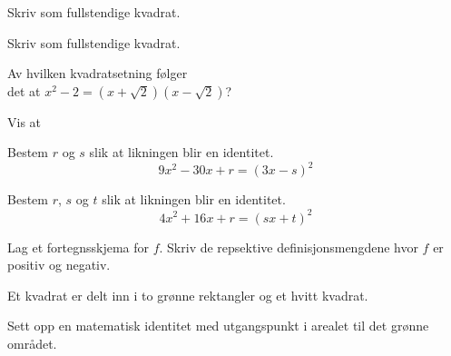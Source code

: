 





\opgt	

Skriv som fullstendige kvadrat.\os
{} \os
{}

Skriv som fullstendige kvadrat.\os
{} \os
{}

Av hvilken kvadratsetning følger\\ det at $x^2-2 = \left(x+\sqrt{2}\right)\left(x-\sqrt{2}\right)$?

Vis at \vso
{}

Bestem $r$ og $s$ slik at likningen blir en identitet.
\[ 9x^2-30x+r=(3x-s)^2 \]


Bestem $r$, $s$ og $t$ slik at likningen blir en identitet.
\[ 4x^2+16x+r=(sx+t)^2 \]

Lag et fortegnsskjema for $f$. Skriv de repsektive definisjonsmengdene hvor $f$ er positiv og negativ. \os

\newpage
{}
Et kvadrat er delt inn i to grønne rektangler og et hvitt kvadrat. \os

Sett opp en matematisk identitet med utgangspunkt i arealet til det grønne området.

